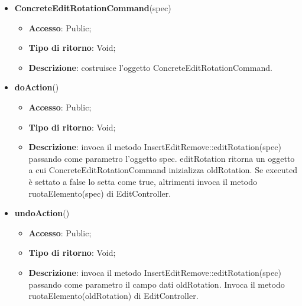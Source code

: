 {{{\begin{itemize}
\begin{itemize}
\begin{itemize}
\begin{itemize}
			\end{itemize}
		\end{itemize}
			\end{itemize}
			\end{itemize}
		\begin{itemize}
			\item \textbf{ConcreteEditRotationCommand}(spec)
			\begin{itemize}
				\item \textbf{Accesso}: Public;
				\item \textbf{Tipo di ritorno}: Void;
				\item \textbf{Descrizione}: costruisce l’oggetto ConcreteEditRotationCommand.
			\end{itemize}
			\item \textbf{doAction}()
			\begin{itemize}
				\item \textbf{Accesso}: Public;
				\item \textbf{Tipo di ritorno}: Void;
				\item \textbf{Descrizione}: invoca il metodo InsertEditRemove::editRotation(spec) passando come parametro l'oggetto spec. editRotation ritorna un oggetto a cui ConcreteEditRotationCommand inizializza oldRotation. Se executed è settato a false lo setta come true, altrimenti invoca il metodo ruotaElemento(spec) di EditController.
			\end{itemize}
			\item \textbf{undoAction}()
			\begin{itemize}
				\item \textbf{Accesso}: Public;
				\item \textbf{Tipo di ritorno}: Void;
				\item \textbf{Descrizione}: invoca il metodo InsertEditRemove::editRotation(spec) passando come parametro il campo dati oldRotation. Invoca il metodo ruotaElemento(oldRotation) di EditController.
			\end{itemize}
		\end{itemize}
		}

}}
